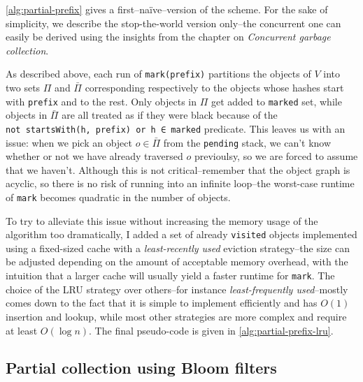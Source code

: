 \cref{alg:partial-prefix} gives a first--naïve--version of the scheme. For the sake of simplicity, we describe the stop-the-world version only--the concurrent one can easily be derived using the insights from the chapter on \emph{Concurrent garbage collection}.



\bigskip
As described above, each run of \texttt{mark(prefix)} partitions the objects of \(V\) into two sets \(\Pi\) and \(\bar{\Pi}\) corresponding respectively to the objects whose hashes start with \texttt{prefix} and to the rest. Only objects in \(\Pi\) get added to \texttt{marked} set, while objects in \(\bar{\Pi}\) are all treated as if they were black because of the \texttt{not\ startsWith(h,\ prefix)\ or\ h\ ∈\ marked} predicate. This leaves us with an issue: when we pick an object \(o \in \bar{\Pi}\) from the \texttt{pending} stack, we can't know whether or not we have already traversed \(o\) previoulsy, so we are forced to assume that we haven't. Although this is not critical--remember that the object graph is acyclic, so there is no risk of running into an infinite loop--the worst-case runtime of \texttt{mark} becomes quadratic in the number of objects.

To try to alleviate this issue without increasing the memory usage of the algorithm too dramatically, I added a set of already \texttt{visited} objects implemented using a fixed-sized cache with a \emph{least-recently used} eviction strategy--the size can be adjusted depending on the amount of acceptable memory overhead, with the intuition that a larger cache will usually yield a faster runtime for \texttt{mark}. The choice of the LRU strategy over others--for instance \emph{least-frequently used}--mostly comes down to the fact that it is simple to implement efficiently and has \(O(1)\) insertion and lookup, while most other strategies are more complex and require at least \(O(\log{n})\). The final pseudo-code is given in \cref{alg:partial-prefix-lru}.





\subsection{Partial collection using Bloom filters}

